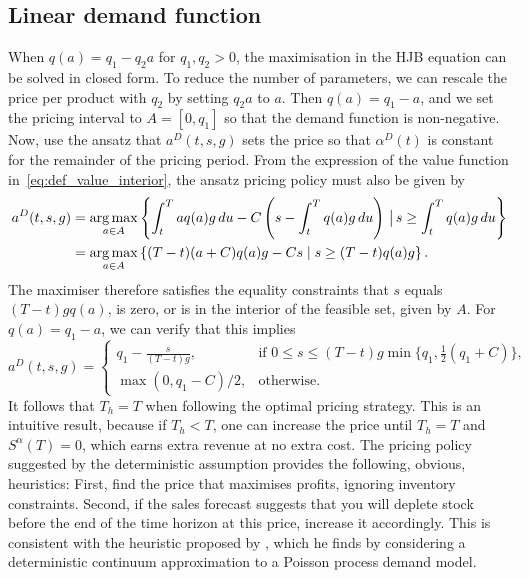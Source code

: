 \documentclass[main.tex]{subfiles}
\begin{document}
\subsection{Linear demand function}
When $q(a)=q_1-q_2a$ for $q_1,q_2>0$, the maximisation in the HJB
equation can be solved in closed form.
To reduce the number of parameters, we can rescale the price per
product with $q_2$ by setting $q_2a$ to $a$.
Then $q(a)=q_1-a$, and we set the pricing interval to $A=[0,q_1]$ so that the demand
function is non-negative.
Now, use the ansatz that $a^D(t,s,g)$ sets the price so that
$\alpha^D(t)$ is
constant for the remainder of the pricing period.
From the expression of the value function
in~\eqref{eq:def_value_interior}, the ansatz pricing policy must
also be given by
\begin{align}
  a^D(t,s,g)
  &=\operatorname*{arg\,max}_{a\in A}\left\{\int_t^Taq(a)g\,du -
    C\left(s-\int_t^Tq(a)g\,du\right) \,\big|\,  s \geq \int_t^Tq(a)g\,du\right\}\\
  &=\operatorname*{arg\,max}_{a\in A}\left\{(T-t)(a+C)q(a)g-Cs \mid  s \geq
    (T-t)q(a)g\right\}.
\end{align}
The maximiser therefore satisfies the equality constraints that
$s$ equals $(T-t)gq(a)$, is zero, or is in the interior of the feasible set,
given by $A$.
For $q(a)=q_1-a$, we can verify that this implies
\begin{equation}\label{eq:astar_linear}
  a^D(t,s,g)=\begin{cases}
    q_1-\frac{s}{(T-t)g}, &\text{if } 0\leq s\leq
    (T-t)g\min\{q_1,\frac{1}{2}(q_1 +C)\},\\
    \max(0,q_1-C)/2,&\text{otherwise.}
  \end{cases}
\end{equation}
It follows that $T_h=T$ when following the optimal pricing strategy.
This is an intuitive result, because if $T_h<T$, one can increase the
price until $T_h=T$ and $S^\alpha(T)=0$, which earns extra revenue at no extra cost.
The pricing policy suggested by the
deterministic assumption provides the following, obvious, heuristics:
First, find the price that maximises profits, ignoring inventory
constraints. Second, if the sales forecast suggests that you will deplete stock
before the end of the time horizon at this price, increase it
accordingly. This is consistent with the heuristic proposed
by \citet{schlosser2015dynamic1,schlosser2015dynamic2}, which
he finds by considering a deterministic continuum
approximation to a Poisson process demand model.
\end{document}
